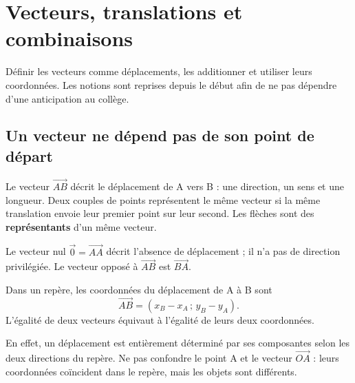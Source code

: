\documentclass[../cours_2de.tex]{subfiles}
\begin{document}
\setcounter{chapter}{7}
\chapter{Vecteurs, translations et combinaisons}
\label{sec:ch08}
\begin{objectif}
Définir les vecteurs comme déplacements, les additionner et utiliser leurs coordonnées. Les notions sont reprises depuis le début afin de ne pas dépendre d'une anticipation au collège.
\end{objectif}
\section{Un vecteur ne dépend pas de son point de départ}
Le vecteur $\overrightarrow{AB}$ décrit le déplacement de A vers B : une direction, un sens et une longueur. Deux couples de points représentent le même vecteur si la même translation envoie leur premier point sur leur second. Les flèches sont des \textbf{représentants} d'un même vecteur.

Le vecteur nul $\vec0=\overrightarrow{AA}$ décrit l'absence de déplacement ; il n'a pas de direction privilégiée. Le vecteur opposé à $\overrightarrow{AB}$ est $\overrightarrow{BA}$.
\begin{definition}
Dans un repère, les coordonnées du déplacement de A à B sont
\[
\overrightarrow{AB}=(x_B-x_A\,;\,y_B-y_A).
\]
L'égalité de deux vecteurs équivaut à l'égalité de leurs deux coordonnées.
\end{definition}
En effet, un déplacement est entièrement déterminé par ses composantes selon les deux directions du repère. Ne pas confondre le point A et le vecteur $\overrightarrow{OA}$ : leurs coordonnées coïncident dans le repère, mais les objets sont différents.
\end{document}
